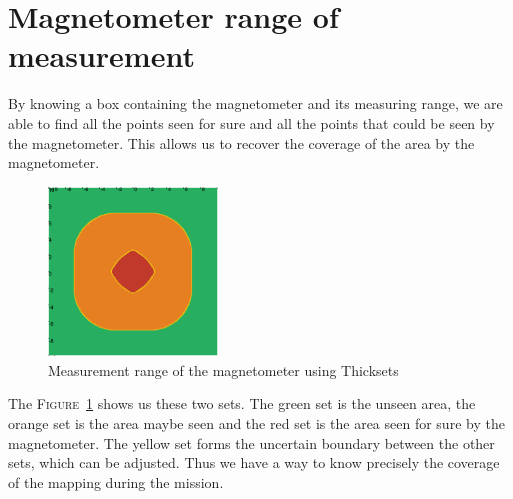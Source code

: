 \section*{Magnetometer range of measurement}
    By knowing a box containing the magnetometer and its measuring range, we are able to find all the points seen for sure and all the points that could be seen by the magnetometer. This allows us to recover the coverage of the area by the magnetometer.

    \begin{figure}[!htb]
        \centering
        \includegraphics[width=0.4\textwidth]{imgs/thickset_cmap.png}
        \caption{\label{fig:thickset} Measurement range of the magnetometer using Thicksets}
    \end{figure}

    The \textsc{Figure}~\ref{fig:thickset} shows us these two sets. The green set is the unseen area, the orange set is the area maybe seen and the red set is the area seen for sure by the magnetometer. The yellow set forms the uncertain boundary between the other sets, which can be adjusted. Thus we have a way to know precisely the coverage of the mapping during the mission.